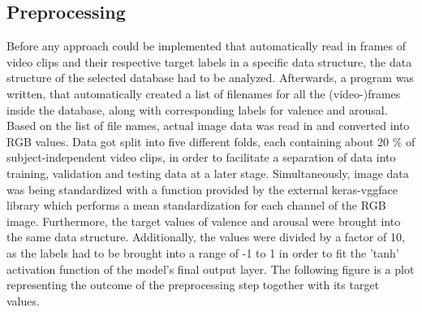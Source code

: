 \subsection{Preprocessing}
Before any approach could be implemented that automatically read in frames of video clips and their respective target labels in a specific data structure, the data structure of the selected database had to be analyzed.
\newline\newline
Afterwards, a program was written, that automatically created a list of filenames for all the (video-)frames inside the database, along with corresponding labels for valence and arousal. Based on the list of file names, actual image data was read in and converted into RGB values. Data got split into five different folds, each containing about 20 \% of subject-independent video clips, in order to facilitate a separation of data into training, validation and testing data at a later stage. Simultaneously, image data was being standardized with a function provided by the external keras-vggface library which performs a mean standardization for each channel of the RGB image.
\newline\newline
Furthermore, the target values of valence and arousal were brought into the same data structure. Additionally, the values were divided by a factor of 10, as the labels had to be brought into a range of -1 to 1 in order to fit the 'tanh' activation function of the model's final output layer. The following figure is a plot representing the outcome of the preprocessing step together with its target values.



